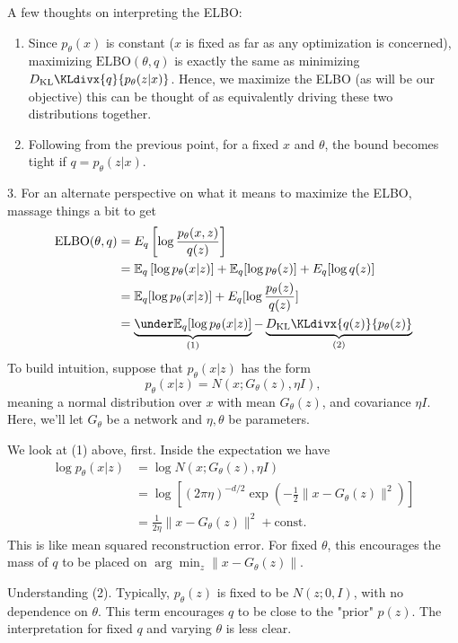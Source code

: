 \documentclass{article}
\newcommand{\E}{\mathbb{E}}
\newcommand{\ELBO}{\text{ELBO}}
\newcommand{\KLdiv}{D_{\text{KL}}\KLdivx}
\begin{document}
\vspace{1em}\noindent 
A few thoughts on interpreting the ELBO: 
\begin{enumerate}
\item  Since $p_\theta(x)$ is constant ($x$ is fixed as far as any optimization is concerned), maximizing $\ELBO(\theta, q)$ is exactly the same as minimizing $\KLdiv{q}{p_\theta(z|x)}$. Hence, we maximize the ELBO (as will be our objective) this can be thought of as equivalently driving these two distributions together.

\item Following from the previous point, for a fixed $x$ and $\theta$, the bound becomes tight if $q = p_\theta(z|x)$.
\end{enumerate}

3. For an alternate perspective on what it means to maximize the ELBO, massage things a bit to get
\begin{align}
\ELBO(\theta, q) & = E_q\left[ \log \frac{p_\theta(x,z)}{q(z)} \right]\\
& = \E_q\left[ \log p_\theta(x|z) \right] + \E_q[\log p_\theta(z)]  + E_q[\log q(z)]\\
& = \E_q[\log p_\theta(x|z)] + E_q[\log \frac{p_\theta(z)}{q(z)}]\\
& = \underbrace{\under\E_q[\log p_\theta(x|z)]}_{(1)} - \underbrace{\KLdiv{q(z)}{p_\theta(z)}}_{(2)}
\end{align}
To build intuition, suppose that $p_\theta(x|z)$ has the form
$$
p_\theta(x|z) = N(x; G_\theta(z), \eta I),
$$
meaning a normal distribution over $x$ with mean $G_\theta(z)$, and covariance $\eta I$. Here, we'll let $G_\theta$ be a network and $\eta, \theta$ be parameters. 

We look at (1) above, first. Inside the expectation we have
\begin{align}
    \log p_\theta(x|z) & = \log N(x; G_\theta(z), \eta I)\\
    & = \log \left[ (2\pi \eta)^{-d/2} \exp(-\frac{1}{2}\|x - G_\theta(z)\|^2) \right]\\
    & = \frac{1}{2\eta} \|x - G_\theta(z)\|^2 + \text{const}.
\end{align}
This is like mean squared reconstruction error. For fixed $\theta$, this encourages the mass of $q$ to be placed on $\arg\min_z \|x - G_\theta(z)\|$. 

Understanding (2). Typically, $p_\theta(z)$ is fixed to be $N(z; 0, I)$, with no dependence on $\theta$. This term encourages $q$ to be close to the "prior" $p(z)$. The interpretation for fixed $q$ and varying $\theta$ is less clear.
\end{document}
